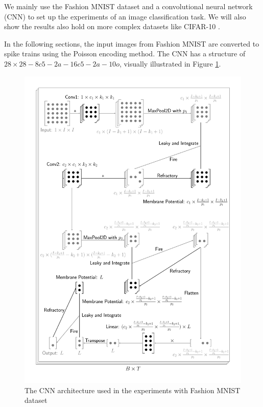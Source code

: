     We mainly use the Fashion MNIST dataset \cite{xiao2017/online} and a convolutional neural network (CNN) \cite{726791} to set up the experiments of an image classification task. We will also show the results also hold on more complex datasets like CIFAR-10 \cite{Krizhevsky2009}. 

    In the following sections, the input images from Fashion MNIST are converted to spike trains using the Poisson encoding method. The CNN has a structure of $28\times 28 - 8c5 - 2a - 16c5 - 2a - 10o$, visually illustrated in Figure \ref{fig:scnn_structure}. 

    \begin{figure}[!htpb]
        \centering
        \includegraphics[width=\textwidth]{assets/standard/FashionMNIST/snn3.pdf}
        \caption{The CNN architecture used in the experiments with Fashion MNIST dataset}
        \label{fig:scnn_structure}
    \end{figure}

